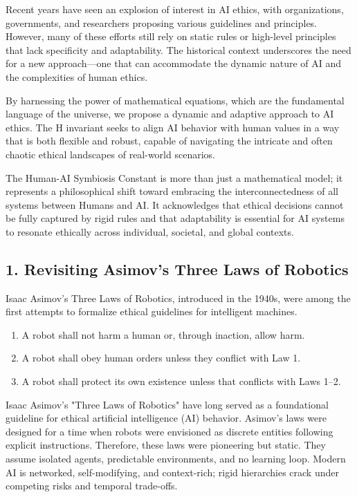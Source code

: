 \documentclass[a4paper,12pt]{article}
\begin{document}
\hfill{}

Recent years have seen an explosion of interest in AI ethics, with organizations, governments, and researchers proposing various guidelines and principles. However, many of these efforts still rely on static rules or high-level principles that lack specificity and adaptability. The historical context underscores the need for a new approach—one that can accommodate the dynamic nature of AI and the complexities of human ethics.

\hfill{}

 By harnessing the power of mathematical equations, which are the fundamental language of the universe, we propose a dynamic and adaptive approach to AI ethics. The H invariant seeks to align AI behavior with human values in a way that is both flexible and robust, capable of navigating the intricate and often chaotic ethical landscapes of real-world scenarios.
 
 \hfill{}

The Human-AI Symbiosis Constant is more than just a mathematical model; it represents a philosophical shift toward embracing the interconnectedness of all systems between Humans and AI. It acknowledges that ethical decisions cannot be fully captured by rigid rules and that adaptability is essential for AI systems to resonate ethically across individual, societal, and global contexts. 


\newpage



\subsection*{1. Revisiting Asimov’s Three Laws of Robotics}

Isaac Asimov's Three Laws of Robotics, introduced in the 1940s, were among the first attempts to formalize ethical guidelines for intelligent machines.

\begin{enumerate}\setlength{\itemsep}{0pt}
  \item A robot shall not harm a human or, through inaction, allow harm.  
  \item A robot shall obey human orders unless they conflict with Law 1.  
  \item A robot shall protect its own existence unless that conflicts with Laws 1–2.  
\end{enumerate}

Isaac Asimov's "Three Laws of Robotics" have long served as a foundational guideline for ethical artificial intelligence (AI) behavior. Asimov's laws were designed for a time when robots were envisioned as discrete entities following explicit instructions. Therefore, these laws were pioneering but static. They assume isolated agents, predictable environments, and no learning loop. Modern AI is networked, self-modifying, and context-rich; rigid hierarchies crack under competing risks and temporal trade-offs.
\end{document}
